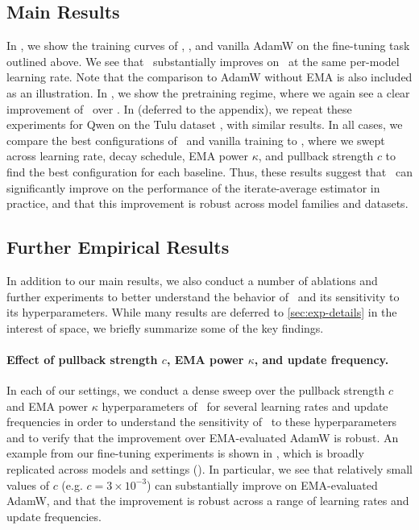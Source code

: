 \subsection{Main Results}
\label{sec:exp-main}

In , we show the training curves of \pace, \ema, and vanilla AdamW on the fine-tuning task outlined above.  We see that \pace\ substantially improves on \ema\ at the same per-model learning rate.  Note that the comparison to AdamW without EMA is also included as an illustration.
 In , we show the \iftoggle{colt}{}{same comparison for the} pretraining regime, where we again see a clear improvement of \pace\ over \ema.  
 In  (deferred to the appendix), we repeat these experiments for Qwen on the Tulu dataset \citep{lambert2024tulu}, with similar results.
In all cases, we compare the best configurations of \ema\ and vanilla training to \pace, where we swept across learning rate, decay schedule, EMA power $\kappa$, and pullback strength $c$ to find the best configuration for each baseline.  Thus, these results suggest that \pace\ can significantly improve on the performance of the iterate-average estimator in practice, and that this improvement is robust across model families and datasets.





\subsection{Further Empirical Results}
\label{sec:exp-further}

In addition to our main results, we also conduct a number of ablations and further experiments to better understand the behavior of \pace\ and its sensitivity to its hyperparameters.  While many results are deferred to \cref{sec:exp-details} in the interest of space, we briefly summarize some of the key findings.

\paragraph{Effect of pullback strength $c$, EMA power $\kappa$, and update frequency.}  In each of our settings, we conduct a dense sweep over the pullback strength $c$ and EMA power $\kappa$ hyperparameters of \pace\ for several learning rates and update frequencies in order to understand the sensitivity of \pace\ to these hyperparameters and to verify that the improvement over EMA-evaluated AdamW is robust.  An example from our fine-tuning experiments is shown in , which is broadly replicated across models and settings ().  In particular, we see that relatively small values of $c$ (e.g. $c=3 \times 10^{-3}$) can substantially improve on EMA-evaluated AdamW, and that the improvement is robust across a range of learning rates and update frequencies.




